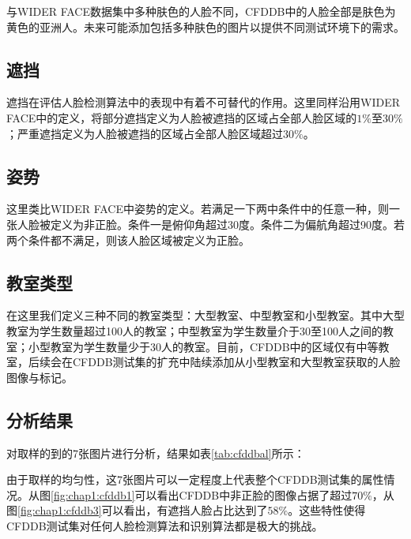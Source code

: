 与WIDER FACE数据集中多种肤色的人脸不同，CFDDB中的人脸全部是肤色为黄色的亚洲人。未来可能添加包括多种肤色的图片以提供不同测试环境下的需求。

\subsection{遮挡}

遮挡在评估人脸检测算法中的表现中有着不可替代的作用。这里同样沿用WIDER FACE中的定义，将部分遮挡定义为人脸被遮挡的区域占全部人脸区域的$1\%$至$30\%$；严重遮挡定义为人脸被遮挡的区域占全部人脸区域超过$30\%$。

\subsection{姿势}

这里类比WIDER FACE中姿势的定义。若满足一下两中条件中的任意一种，则一张人脸被定义为非正脸。条件一是俯仰角超过30度。条件二为偏航角超过90度。若两个条件都不满足，则该人脸区域被定义为正脸。

\subsection{教室类型}

在这里我们定义三种不同的教室类型：大型教室、中型教室和小型教室。其中大型教室为学生数量超过100人的教室；中型教室为学生数量介于30至100人之间的教室；小型教室为学生数量少于30人的教室。目前，CFDDB中的区域仅有中等教室，后续会在CFDDB测试集的扩充中陆续添加从小型教室和大型教室获取的人脸图像与标记。

\subsection{分析结果}

对取样的到的7张图片进行分析，结果如表\ref{tab:cfddbal}所示：

由于取样的均匀性，这7张图片可以一定程度上代表整个CFDDB测试集的属性情况。从图\ref{fig:chap1:cfddb1}可以看出CFDDB中非正脸的图像占据了超过$70\%$，从图\ref{fig:chap1:cfddb3}可以看出，有遮挡人脸占比达到了$58\%$。这些特性使得CFDDB测试集对任何人脸检测算法和识别算法都是极大的挑战。

